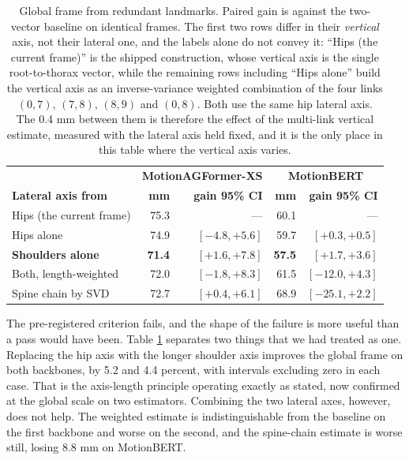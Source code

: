 \documentclass[12pt,a4paper]{report}
\begin{document}
\begin{table}[htbp]
\centering
\caption[Global frame from redundant landmarks]{Global frame from redundant landmarks. Paired gain is against the two-vector baseline on identical frames. The first two rows differ in their \emph{vertical} axis, not their lateral one, and the labels alone do not convey it: ``Hips (the current frame)'' is the shipped construction, whose vertical axis is the single root-to-thorax vector, while the remaining rows including ``Hips alone'' build the vertical axis as an inverse-variance weighted combination of the four links $(0,7)$, $(7,8)$, $(8,9)$ and $(0,8)$. Both use the same hip lateral axis. The 0.4 mm between them is therefore the effect of the multi-link vertical estimate, measured with the lateral axis held fixed, and it is the only place in this table where the vertical axis varies.}
\label{tab:multilandmark}
{\fontsize{10}{12}\selectfont
\begin{tabular}{lrrrr}
\hline
 & \multicolumn{2}{c}{\textbf{MotionAGFormer-XS}} & \multicolumn{2}{c}{\textbf{MotionBERT}} \\
\textbf{Lateral axis from} & \textbf{mm} & \textbf{gain 95\% CI} & \textbf{mm} & \textbf{gain 95\% CI} \\
\hline
Hips (the current frame) & 75.3 & --- & 60.1 & --- \\
Hips alone & 74.9 & $[-4.8, +5.6]$ & 59.7 & $[+0.3, +0.5]$ \\
\textbf{Shoulders alone} & \textbf{71.4} & $\mathbf{[+1.6, +7.8]}$ & \textbf{57.5} & $\mathbf{[+1.7, +3.6]}$ \\
Both, length-weighted & 72.0 & $[-1.8, +8.3]$ & 61.5 & $[-12.0, +4.3]$ \\
Spine chain by SVD & 72.7 & $[+0.4, +6.1]$ & 68.9 & $[-25.1, +2.2]$ \\
\hline
\end{tabular}}
\end{table}

The pre-registered criterion fails, and the shape of the failure is more useful than a pass would have been. Table \ref{tab:multilandmark} separates two things that we had treated as one. Replacing the hip axis with the longer shoulder axis improves the global frame on both backbones, by 5.2 and 4.4 percent, with intervals excluding zero in each case. That is the axis-length principle operating exactly as stated, now confirmed at the global scale on two estimators. Combining the two lateral axes, however, does not help. The weighted estimate is indistinguishable from the baseline on the first backbone and worse on the second, and the spine-chain estimate is worse still, losing 8.8 mm on MotionBERT.
\end{document}
